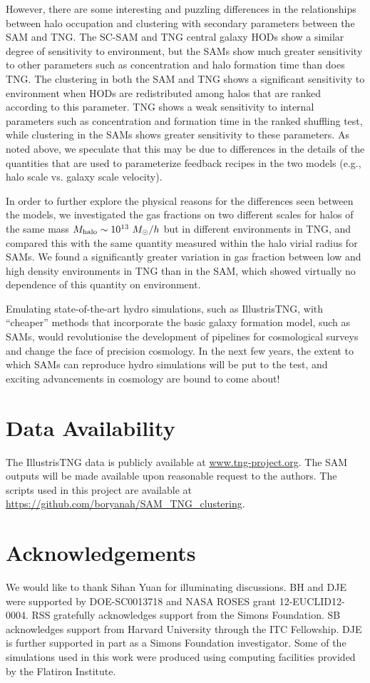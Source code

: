 \documentclass[fleqn,usenatbib]{mnras}
\begin{document}
However, there are some interesting and puzzling differences in the relationships between halo occupation and clustering with secondary parameters between the SAM and TNG. The SC-SAM and TNG central galaxy HODs show a similar degree of sensitivity to environment, but the SAMs show much greater sensitivity to other parameters such as concentration and halo formation time than does TNG. The clustering in both the SAM and TNG shows a significant sensitivity to environment when HODs are redistributed among halos that are ranked according to this parameter. TNG shows a weak sensitivity to internal parameters such as concentration and formation time in the ranked shuffling test, while clustering in the SAMs shows greater sensitivity to these parameters. As noted above, we speculate that this may be due to differences in the details of the quantities that are used to parameterize feedback recipes in the two models (e.g., halo scale vs. galaxy scale velocity).

In order to further explore the physical reasons for the differences seen between the models, we investigated the gas fractions on two different scales for halos of the same mass $M_{\rm halo} \sim 10^{13} \ M_\odot/h$ but in different environments in TNG, and compared this with the same quantity measured within the halo virial radius for SAMs. We found a significantly greater variation in gas fraction between low and high density environments in TNG than in the SAM, which showed virtually no dependence of this quantity on environment. 

Emulating state-of-the-art hydro simulations, such as IllustrisTNG, with ``cheaper'' methods that incorporate the basic galaxy formation model, such as SAMs, would revolutionise the development of  pipelines for cosmological surveys and change the face of precision cosmology. In the next few years, the extent to which SAMs can reproduce hydro simulations will be put to the test, and exciting advancements in cosmology are bound to come about!

\section*{Data Availability}
The IllustrisTNG data is publicly available at \url{www.tng-project.org}. 
The SAM outputs will be made available upon reasonable request to the authors. The scripts used in this project are available at \url{https://github.com/boryanah/SAM_TNG_clustering}.

\section*{Acknowledgements}
We would like to thank Sihan Yuan for illuminating discussions.
BH and DJE were supported by DOE-SC0013718 and NASA ROSES grant 12-EUCLID12-0004.
RSS gratefully acknowledges support from the Simons Foundation.
SB acknowledges support from Harvard University through the ITC Fellowship.
DJE is further supported in part as a Simons Foundation investigator.
Some of the simulations used in this work were produced using computing facilities provided by the Flatiron Institute. 
\end{document}
